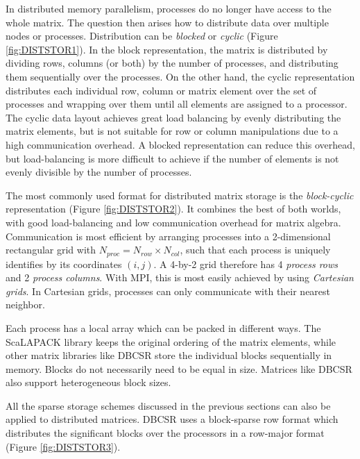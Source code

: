 In distributed memory parallelism, processes do no longer have access to the whole matrix. The question then arises how to distribute data over multiple nodes or processes. Distribution can be \emph{blocked} or \emph{cyclic} (Figure \ref{fig:DISTSTOR1}). In the block representation, the matrix is distributed by dividing rows, columns (or both) by the number of processes, and distributing them sequentially over the processes. On the other hand, the cyclic representation distributes each individual row, column or matrix element over the set of processes and wrapping over them until all elements are assigned to a processor. The cyclic data layout achieves great load balancing by evenly distributing the matrix elements, but is not suitable for row or column manipulations due to a high communication overhead. A blocked representation can reduce this overhead, but load-balancing is more difficult to achieve if the number of elements is not evenly divisible by the number of processes. 

The most commonly used format for distributed matrix storage is the \emph{block-cyclic} representation (Figure \ref{fig:DISTSTOR2}). It combines the best of both worlds, with good load-balancing and low communication overhead for matrix algebra. Communication is most efficient by arranging processes into a 2-dimensional rectangular grid with $N_{proc} = N_{row} \times N_{col}$, such that each process is uniquely identifies by its coordinates $(i,j)$. A 4-by-2 grid therefore has 4 \emph{process rows} and 2 \emph{process columns}. With MPI, this is most easily achieved by using \emph{Cartesian grids}. In Cartesian grids, processes can only communicate with their nearest neighbor. 

Each process has a local array which can be packed in different ways. The ScaLAPACK library keeps the original ordering of the matrix elements, while other matrix libraries like DBCSR store the individual blocks sequentially in memory. Blocks do not necessarily need to be equal in size. Matrices like DBCSR also support heterogeneous block sizes.

All the sparse storage schemes discussed in the previous sections can also be applied to distributed matrices. DBCSR uses a block-sparse row format which distributes the significant blocks over the processors in a row-major format (Figure \ref{fig:DISTSTOR3}). 

